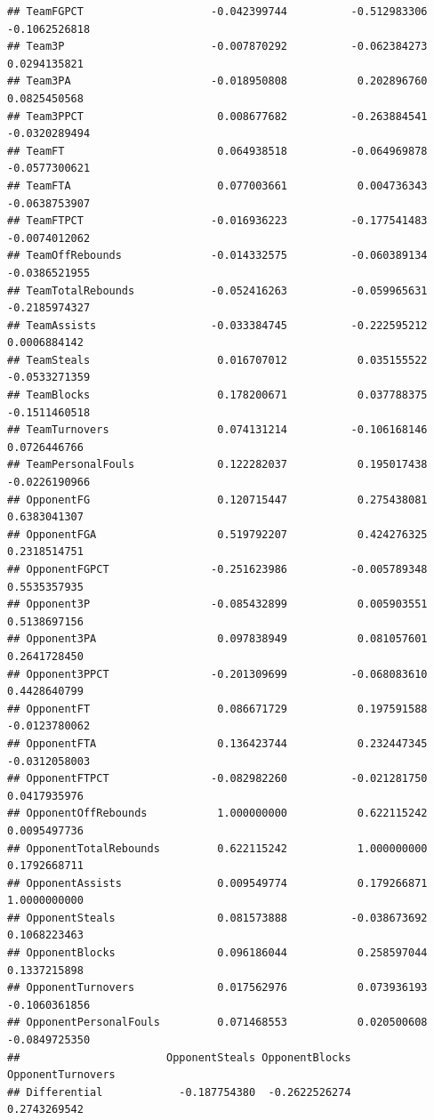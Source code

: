 \documentclass[
]{book}
\begin{document}
\begin{verbatim}
## TeamFGPCT                    -0.042399744          -0.512983306   -0.1062526818
## Team3P                       -0.007870292          -0.062384273    0.0294135821
## Team3PA                      -0.018950808           0.202896760    0.0825450568
## Team3PPCT                     0.008677682          -0.263884541   -0.0320289494
## TeamFT                        0.064938518          -0.064969878   -0.0577300621
## TeamFTA                       0.077003661           0.004736343   -0.0638753907
## TeamFTPCT                    -0.016936223          -0.177541483   -0.0074012062
## TeamOffRebounds              -0.014332575          -0.060389134   -0.0386521955
## TeamTotalRebounds            -0.052416263          -0.059965631   -0.2185974327
## TeamAssists                  -0.033384745          -0.222595212    0.0006884142
## TeamSteals                    0.016707012           0.035155522   -0.0533271359
## TeamBlocks                    0.178200671           0.037788375   -0.1511460518
## TeamTurnovers                 0.074131214          -0.106168146    0.0726446766
## TeamPersonalFouls             0.122282037           0.195017438   -0.0226190966
## OpponentFG                    0.120715447           0.275438081    0.6383041307
## OpponentFGA                   0.519792207           0.424276325    0.2318514751
## OpponentFGPCT                -0.251623986          -0.005789348    0.5535357935
## Opponent3P                   -0.085432899           0.005903551    0.5138697156
## Opponent3PA                   0.097838949           0.081057601    0.2641728450
## Opponent3PPCT                -0.201309699          -0.068083610    0.4428640799
## OpponentFT                    0.086671729           0.197591588   -0.0123780062
## OpponentFTA                   0.136423744           0.232447345   -0.0312058003
## OpponentFTPCT                -0.082982260          -0.021281750    0.0417935976
## OpponentOffRebounds           1.000000000           0.622115242    0.0095497736
## OpponentTotalRebounds         0.622115242           1.000000000    0.1792668711
## OpponentAssists               0.009549774           0.179266871    1.0000000000
## OpponentSteals                0.081573888          -0.038673692    0.1068223463
## OpponentBlocks                0.096186044           0.258597044    0.1337215898
## OpponentTurnovers             0.017562976           0.073936193   -0.1060361856
## OpponentPersonalFouls         0.071468553           0.020500608   -0.0849725350
##                       OpponentSteals OpponentBlocks OpponentTurnovers
## Differential            -0.187754380  -0.2622526274      0.2743269542

\end{verbatim}
\end{document}
